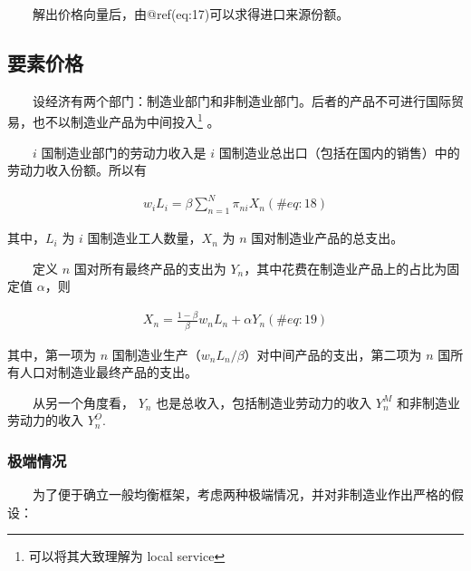 \documentclass[]{tufte-handout}
\begin{document}
　　解出价格向量后，由@ref(eq:17)可以求得进口来源份额。

\hypertarget{ux8981ux7d20ux4ef7ux683c}{%
\subsection{要素价格}\label{ux8981ux7d20ux4ef7ux683c}}

　　设经济有两个部门：制造业部门和非制造业部门。后者的产品不可进行国际贸易，也不以制造业产品为中间投入\footnote{可以将其大致理解为
  local service} 。

　　\(i\) 国制造业部门的劳动力收入是 \(i\)
国制造业总出口（包括在国内的销售）中的劳动力收入份额。所以有

\begin{align}
w_{i} L_{i}=\beta \sum_{n=1}^{N} \pi_{n i} X_{n} (\#eq:18)
\end{align}

其中，\(L_i\) 为 \(i\) 国制造业工人数量，\(X_n\) 为 \(n\)
国对制造业产品的总支出。

　　定义 \(n\) 国对所有最终产品的支出为
\(Y_n\)，其中花费在制造业产品上的占比为固定值 \(\alpha\)，则

\begin{align}
X_{n}=\frac{1-\beta}{\beta} w_{n} L_{n}+\alpha Y_{n} (\#eq:19)
\end{align}

其中，第一项为 \(n\)
国制造业生产（\(w_{n}L_{n}/\beta\)）对中间产品的支出，第二项为 \(n\)
国所有人口对制造业最终产品的支出。

　　从另一个角度看， \(Y_n\) 也是总收入，包括制造业劳动力的收入
\(Y_n^M\) 和非制造业劳动力的收入 \(Y_n^O\).

\hypertarget{ux6781ux7aefux60c5ux51b5}{%
\subsubsection{极端情况}\label{ux6781ux7aefux60c5ux51b5}}

　　为了便于确立一般均衡框架，考虑两种极端情况，并对非制造业作出严格的假设：
\end{document}
